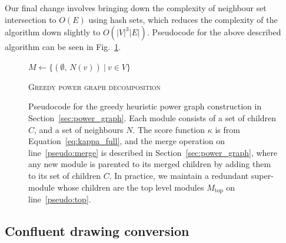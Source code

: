 Our final change involves bringing down the complexity of neighbour set intersection to $O(E)$ using hash sets, which reduces the complexity of the algorithm down slightly to $O(|V|^3|E|)$.
Pseudocode for the above described algorithm can be seen in Fig.~\ref{fig:pseudocode_pgd}.

\begin{figure}
    \removeAlgorithmFigureError
    \DontPrintSemicolon
    \begin{algorithm}[H]
        
        $M \leftarrow \{(\emptyset,\,N(v))\ |\ v\in V\}$
        
        \caption{\textsc{Greedy power graph decomposition}}
        \label{algo:pgd}
    \end{algorithm}
    
    \caption[Pseudocode for improved power graph decomposition]{Pseudocode for the greedy heuristic power graph construction in Section~\ref{sec:power_graph}.
    Each module consists of a set of children $C$, and a set of neighbours $N$.
    The score function $\kappa$ is from Equation~\eqref{eq:kappa_full}, and the merge operation on line~\ref{pseudo:merge} is described in Section~\ref{sec:power_graph}, where any new module is parented to its merged children by adding them to its set of children $C$.
    In practice, we maintain a redundant super-module whose children are the top level modules $M_\mathrm{top}$ on line~\ref{pseudo:top}.}
    \label{fig:pseudocode_pgd}
\end{figure} 

\subsection{Confluent drawing conversion}
\label{sec:confluent_definition}

